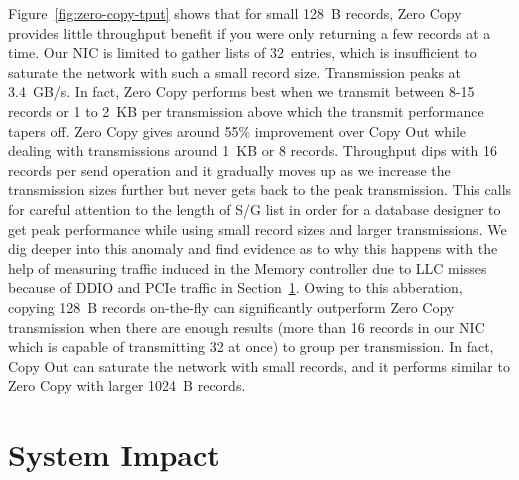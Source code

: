 
Figure~\ref{fig:zero-copy-tput} shows that for small 128~B records, Zero Copy
provides little throughput benefit if you were only returning a few records 
at a time. Our NIC is limited to gather lists
of 32~entries, which is insufficient to saturate the network with such a small
record size. Transmission peaks at 3.4~GB/s. In fact, Zero Copy performs best when
we transmit between 8-15 records or 1 to 2~KB per transmission above which the transmit performance 
tapers off. Zero Copy gives around 55\% improvement over Copy Out while dealing 
with transmissions around 1~KB or 8 records. Throughput dips with 16 records per send operation and it gradually moves up as we 
increase the transmission sizes further but never gets back to the peak transmission. This calls 
for careful attention to the length of S/G list in order for a database designer to get peak performance while using small record sizes and larger 
transmissions. We dig deeper into this anomaly and find evidence as to why this happens with the 
help of measuring traffic induced in the Memory controller due to LLC misses because of DDIO and 
PCIe traffic in Section~\ref{sec:impact}. Owing to this abberation, copying 128~B records 
on-the-fly can significantly outperform Zero Copy transmission when there are 
enough results (more than 16 records in our NIC which is capable of transmitting 32 at once) to group per transmission.
In fact, Copy Out can saturate the network with small records, and it
performs similar to Zero Copy with larger 1024~B records.


\section{System Impact}
\label{sec:impact}

